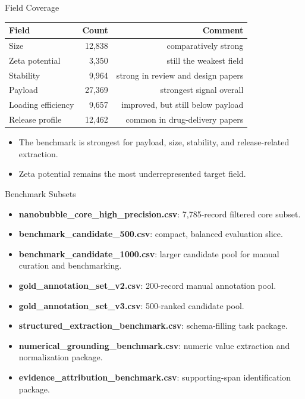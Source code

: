 \documentclass[aspectratio=169]{beamer}
\begin{document}
\begin{frame}{Field Coverage}
\begin{tabularx}{\textwidth}{lrr}
\toprule
Field & Count & Comment \\
\midrule
Size & 12,838 & comparatively strong \\
Zeta potential & 3,350 & still the weakest field \\
Stability & 9,964 & strong in review and design papers \\
Payload & 27,369 & strongest signal overall \\
Loading efficiency & 9,657 & improved, but still below payload \\
Release profile & 12,462 & common in drug-delivery papers \\
\bottomrule
\end{tabularx}
\vspace{0.6em}
\begin{itemize}
    \item The benchmark is strongest for payload, size, stability, and release-related extraction.
    \item Zeta potential remains the most underrepresented target field.
\end{itemize}
\end{frame}

\begin{frame}{Benchmark Subsets}
\begin{itemize}
    \item \textbf{nanobubble\_core\_high\_precision.csv}: 7,785-record filtered core subset.
    \item \textbf{benchmark\_candidate\_500.csv}: compact, balanced evaluation slice.
    \item \textbf{benchmark\_candidate\_1000.csv}: larger candidate pool for manual curation and benchmarking.
    \item \textbf{gold\_annotation\_set\_v2.csv}: 200-record manual annotation pool.
    \item \textbf{gold\_annotation\_set\_v3.csv}: 500-ranked candidate pool.
    \item \textbf{structured\_extraction\_benchmark.csv}: schema-filling task package.
    \item \textbf{numerical\_grounding\_benchmark.csv}: numeric value extraction and normalization package.
    \item \textbf{evidence\_attribution\_benchmark.csv}: supporting-span identification package.
\end{itemize}
\end{frame}
\end{document}
